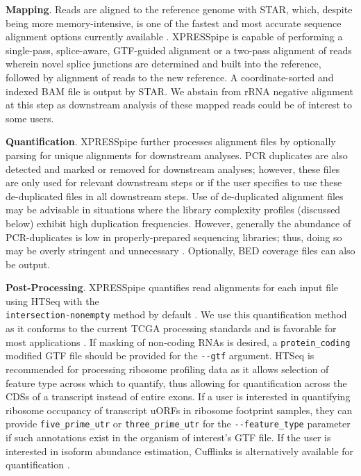 \documentclass[10pt, oneside]{article}
\begin{document}
\noindent\textbf{Mapping}. Reads are aligned to the reference genome with STAR, which, despite being more memory-intensive, is one of the fastest and most accurate sequence alignment options currently available \cite{star, baruzzo_natmeth}. XPRESSpipe is capable of performing a single-pass, splice-aware, GTF-guided alignment or a two-pass alignment of reads wherein novel splice junctions are determined and built into the reference, followed by alignment of reads to the new reference. A coordinate-sorted and indexed BAM file is output by STAR. We abstain from rRNA negative alignment at this step as downstream analysis of these mapped reads could be of interest to some users. \par

\noindent\textbf{Quantification}. XPRESSpipe further processes alignment files by optionally parsing for unique alignments for downstream analyses. PCR duplicates are also detected and marked or removed for downstream analyses; however, these files are only used for relevant downstream steps or if the user specifies to use these de-duplicated files in all downstream steps. Use of de-duplicated alignment files may be advisable in situations where the library complexity profiles (discussed below) exhibit high duplication frequencies. However, generally the abundance of PCR-duplicates is low in properly-prepared sequencing libraries; thus, doing so may be overly stringent and unnecessary \cite{umi}. Optionally, BED coverage files can also be output. \par

\noindent\textbf{Post-Processing}. XPRESSpipe quantifies read alignments for each input file using HTSeq with the \\\texttt{intersection-nonempty} method by default \cite{htseq, count_benchmark}. We use this quantification method as it conforms to the current TCGA processing standards and is favorable for most applications \cite{tcga}. If masking of non-coding RNAs is desired, a \texttt{protein\_coding} modified GTF file should be provided for the \texttt{-{}-gtf} argument. HTSeq is recommended for processing ribosome profiling data as it allows selection of feature type across which to quantify, thus allowing for quantification across the CDSs of a transcript instead of entire exons. If a user is interested in quantifying ribosome occupancy of transcript uORFs in ribosome footprint samples, they can provide \texttt{five\_prime\_utr} or \texttt{three\_prime\_utr} for the \texttt{-{}-feature\_type} parameter if such annotations exist in the organism of interest's GTF file. If the user is interested in isoform abundance estimation, Cufflinks is alternatively available for quantification \cite{cufflinks, count_benchmark}. \par
\end{document}
